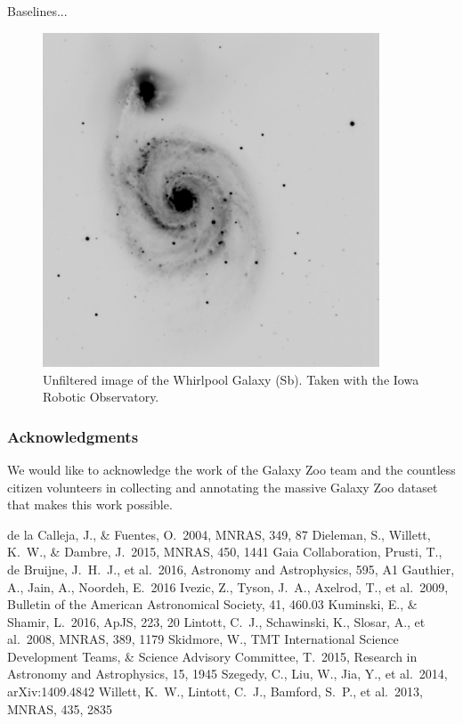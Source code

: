 \documentclass{article}
\begin{document}
Baselines...



\begin{figure}[h]
  \centering
	\includegraphics[width=100mm]{../img/M51.pdf}
  \caption{Unfiltered image of the Whirlpool Galaxy (Sb). Taken with the Iowa Robotic Observatory.}
  \label{fig:M51}
\end{figure}

\subsubsection*{Acknowledgments}

We would like to acknowledge the work of the Galaxy Zoo team and the countless citizen volunteers in collecting and annotating the massive Galaxy Zoo dataset that makes this work possible. 


\begin{thebibliography}{9}
 de la Calleja, J., \& Fuentes, O.\ 2004, MNRAS, 349, 87 
 Dieleman, S., Willett, K.~W., \& Dambre, J.\ 2015, MNRAS, 450, 1441
 Gaia Collaboration, Prusti, T., de Bruijne, J.~H.~J., et al.\ 2016, Astronomy and Astrophysics, 595, A1  
 Gauthier, A., Jain, A., Noordeh, E.\ 2016
 Ivezic, Z., Tyson, J.~A., Axelrod, T., et al.\ 2009, Bulletin of the American Astronomical Society, 41, 460.03 
 Kuminski, E., \& Shamir, L.\ 2016, ApJS, 223, 20 
 Lintott, C.~J., Schawinski, K., Slosar, A., et al.\ 2008, MNRAS, 389, 1179
 Skidmore, W., TMT International Science Development Teams, \& Science Advisory Committee, T.\ 2015, Research in Astronomy and Astrophysics, 15, 1945 
 Szegedy, C., Liu, W., Jia, Y., et al.\ 2014, arXiv:1409.4842 
 Willett, K.~W., Lintott, C.~J., Bamford, S.~P., et al.\ 2013, MNRAS, 435, 2835  
\end{thebibliography}
\end{document}
